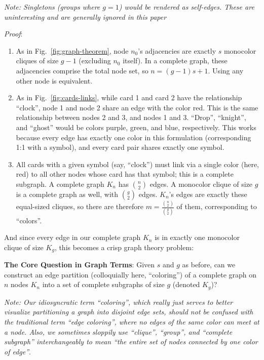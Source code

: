 \documentclass[11pt, oneside]{article} 	%
\begin{document}
\emph{Note: Singletons (groups where $g=1$) would be rendered as self-edges. These are uninteresting and are generally ignored in this paper}

\emph{Proof}:
\begin{enumerate}
\item As in Fig.~\ref{fig:graph-theorem}, node $n_0$'s adjacencies are exactly $s$ monocolor cliques of size $g-1$ (excluding $n_0$ itself). In a complete graph, these adjacencies comprise the total node set, so $n = (g-1)s + 1$. Using any other node is equivalent.
\item As in Fig.~\ref{fig:cards-links}, while card 1 and card 2 have the relationship ``clock'', node 1 and node 2 share an edge with the color red. This is the same relationship between nodes 2 and 3, and nodes 1 and 3. ``Drop'', ``knight'', and ``ghost'' would be colors purple, green, and blue, respectively. This works because every edge has exactly one color in this formulation (corresponding 1:1 with a symbol), and every card pair shares exactly one symbol.
\item All cards with a given symbol (say, ``clock'') must link via a single color (here, red) to all other nodes whose card has that symbol; this is a complete subgraph. A complete graph $K_n$ has ${n \choose 2}$ edges. A monocolor clique of size $g$ is a complete graph as well, with ${g \choose 2}$ edges. $K_n$'s edges are exactly these equal-sized cliques, so there are therefore $m = \frac{{n \choose 2}}{{g \choose 2}}$ of them, corresponding to ``colors''.
\end{enumerate}

And since every edge in our complete graph $K_n$ is in exactly one monocolor clique of size $K_g$, this becomes a crisp graph theory problem:

\begin{framed}
\textbf{The Core Question in Graph Terms}: Given $s$ and $g$ as before, can we construct an edge partition (colloquially here, ``coloring'') of a complete graph on $n$ nodes $K_n$ into a set of complete subgraphs of size $g$ (denoted $K_g$)?
\end{framed}

\emph{Note: Our idiosyncratic term ``coloring'', which really just serves to better visualize partitioning a graph into disjoint edge sets, should not be confused with the traditional term ``edge coloring'', where no edges of the same color can meet at a node. Also, we sometimes sloppily use ``clique'', ``group'', and ``complete subgraph'' interchangeably to mean ``the entire set of nodes connected by one color of edge''}.
\end{document}
